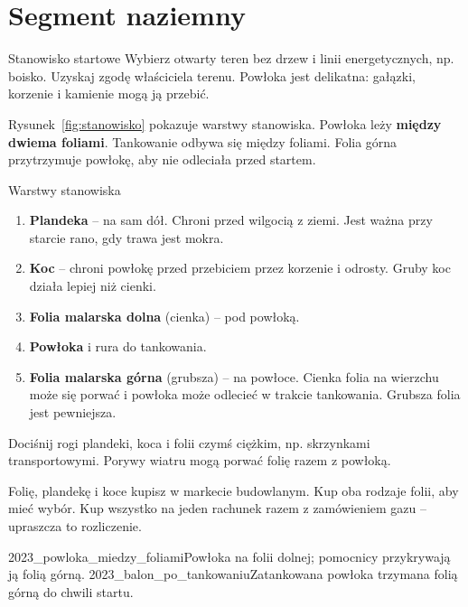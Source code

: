 \chapter{Segment naziemny}\label{ch:naziemny}

\begin{sekcja}{Stanowisko startowe}
Wybierz otwarty teren bez drzew i linii energetycznych, np. boisko. Uzyskaj zgodę właściciela terenu. Powłoka jest delikatna: gałązki, korzenie i kamienie mogą ją przebić.

Rysunek~\ref{fig:stanowisko} pokazuje warstwy stanowiska. Powłoka leży \textbf{między dwiema foliami}. Tankowanie odbywa się między foliami. Folia górna przytrzymuje powłokę, aby nie odleciała przed startem.

\begin{center}\resizebox{\linewidth}{!}{\rysStanowisko}\end{center}
\label{fig:stanowisko}
\end{sekcja}

\begin{podsekcja}{Warstwy stanowiska}
\begin{enumerate}
  \item \textbf{Plandeka} -- na sam dół. Chroni przed wilgocią z ziemi. Jest ważna przy starcie rano, gdy trawa jest mokra.
  \item \textbf{Koc} -- chroni powłokę przed przebiciem przez korzenie i odrosty. Gruby koc działa lepiej niż cienki.
  \item \textbf{Folia malarska dolna} (cienka) -- pod powłoką.
  \item \textbf{Powłoka} i rura do tankowania.
  \item \textbf{Folia malarska górna} (grubsza) -- na powłoce. Cienka folia na wierzchu może się porwać i powłoka może odlecieć w trakcie tankowania. Grubsza folia jest pewniejsza.
\end{enumerate}

\begin{uwaga}Dociśnij rogi plandeki, koca i folii czymś ciężkim, np. skrzynkami transportowymi. Porywy wiatru mogą porwać folię razem z powłoką.\end{uwaga}

\begin{wskazowka}Folię, plandekę i koce kupisz w markecie budowlanym. Kup oba rodzaje folii, aby mieć wybór. Kup wszystko na jeden rachunek razem z zamówieniem gazu -- upraszcza to rozliczenie.\end{wskazowka}

{2023_powloka_miedzy_foliami}{Powłoka na folii dolnej; pomocnicy przykrywają ją folią górną.}
{2023_balon_po_tankowaniu}{Zatankowana powłoka trzymana folią górną do chwili startu.}
\end{podsekcja}

